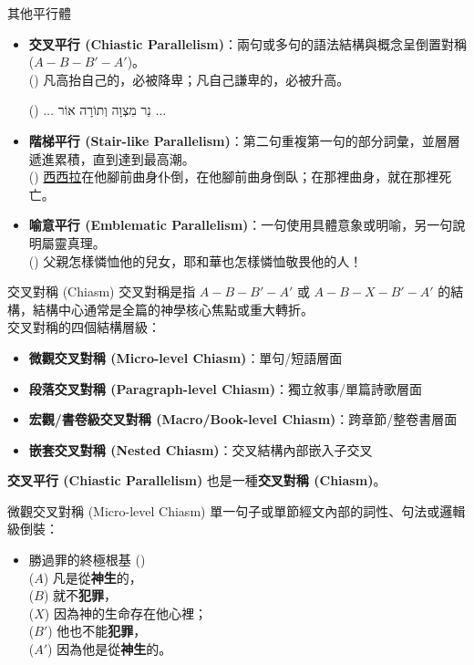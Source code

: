 \documentclass{beamer}
\makeatletter
\newcommand{\biblerefhebrew}[1]{\brm@bibleref{hebrew}{#1}}
\makeatother
\begin{document}
\begin{frame}{其他平行體}
  \begin{itemize}
    \item\textbf{交叉平行 (Chiastic Parallelism)}：兩句或多句的語法結構與概念呈倒置對稱 ($A-B-B'-A'$)。\\
      () 凡高抬自己的，必被降卑；凡自己謙卑的，必被升高。\\
      \begin{hebrew}
        (\biblerefhebrew{Proverbs 6:23}) $\dots$ נֵר מִצְוָה וְתוֹרָה אוֹר $\dots$
      \end{hebrew}
    \item\textbf{階梯平行 (Stair-like Parallelism)}：第二句重複第一句的部分詞彙，並層層遞進累積，直到達到最高潮。\\
      () \uline{西西拉}在他腳前曲身仆倒，在他腳前曲身倒臥；在那裡曲身，就在那裡死亡。\\
    \item\textbf{喻意平行 (Emblematic Parallelism)}：一句使用具體意象或明喻，另一句說明屬靈真理。\\
      () 父親怎樣憐恤他的兒女，耶和華也怎樣憐恤敬畏他的人！
  \end{itemize}
\end{frame}

\begin{frame}{交叉對稱 (Chiasm)}
  交叉對稱\parencite{BiblicalChiasmExchange}是指 $A-B-B'-A'$ 或 $A-B-X-B'-A'$ 的結構，結構中心通常是全篇的神學核心焦點或重大轉折。\\
  交叉對稱的四個結構層級：
  \begin{itemize}
    \item\textbf{微觀交叉對稱 (Micro-level Chiasm)}：單句/短語層面
    \item\textbf{段落交叉對稱 (Paragraph-level Chiasm)}：獨立敘事/單篇詩歌層面
    \item\textbf{宏觀/書卷級交叉對稱 (Macro/Book-level Chiasm)}：跨章節/整卷書層面
    \item\textbf{嵌套交叉對稱 (Nested Chiasm)}：交叉結構內部嵌入子交叉
  \end{itemize}
  \textbf{交叉平行 (Chiastic Parallelism)} 也是一種\textbf{交叉對稱 (Chiasm)}。
\end{frame}

\begin{frame}{微觀交叉對稱 (Micro-level Chiasm)}
  單一句子或單節經文內部的詞性、句法或邏輯級倒裝：
  \begin{itemize}
    \item 勝過罪的終極根基 ()\\
      \quad ($A$) 凡是從\textbf{神生}的，\\
      \quad\quad ($B$) 就不\textbf{犯罪}，\\
      \quad\quad\quad ($X$) 因為神的生命存在他心裡；\\
      \quad\quad ($B'$) 他也不能\textbf{犯罪}，\\
      \quad ($A'$) 因為他是從\textbf{神生}的。\\
  \end{itemize}
\end{frame}
\end{document}
